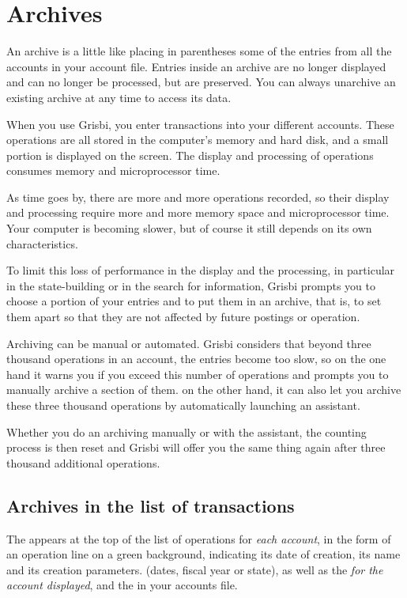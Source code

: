 \section{Archives\label{datamanagement-history}}

An archive is a little like \og placing in parentheses \fg{} some of the entries from all the accounts in your account file. Entries inside an archive are no longer displayed and can no longer be processed, but are preserved. You can always unarchive an existing archive at any time to access its data. 

When you use Grisbi, you enter transactions into your different accounts. These operations are all stored in the computer's memory and hard disk, and a small portion is displayed on the screen. The display and processing of operations consumes memory and microprocessor time.

As time goes by, there are more and more operations recorded, so their display and processing require more and more memory space and microprocessor time. Your computer is becoming slower, but of course it still depends on its own characteristics.

To limit this loss of performance in the display and the processing, in particular in the state-building or in the search for information, Grisbi prompts you to choose a portion of your entries and to put them in an archive, that is, to set them apart so that they are not affected by future postings or operation.

Archiving can be manual or automated. Grisbi considers that beyond three thousand operations in an account, the entries become too slow, so on the one hand it warns you if you exceed this number of operations and prompts you to manually archive a section of them. on the other hand, it can also let you archive these three thousand operations by automatically launching an assistant.

Whether you do an archiving manually or with the assistant, the counting process is then reset and Grisbi will offer you the same thing again after three thousand additional operations.



\subsection{Archives in the list of transactions\label{datamanagement-history-list}}

The  appears at the top of the list of operations for \emph{each account},  in the form of an operation line on a green{\couleur} background, indicating its date of creation, its name and its creation parameters. (dates, fiscal year or state), as well as \ifIllustration the  \emph{for the account displayed}, and the  in your accounts file.


